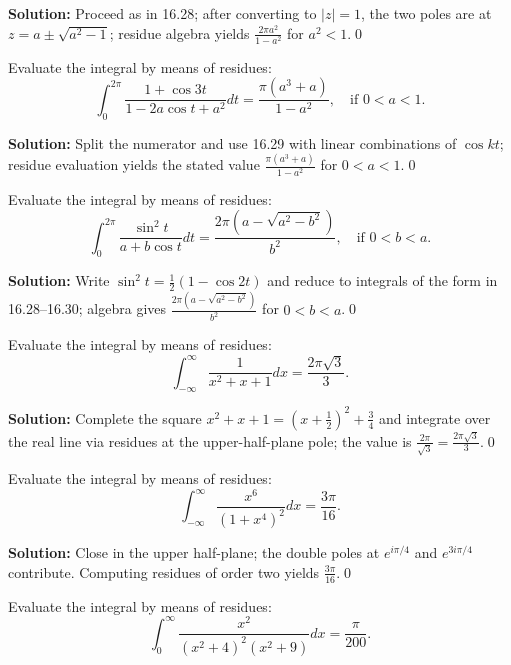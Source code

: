 \noindent\textbf{Solution:}
Proceed as in 16.28; after converting to $|z|=1$, the two poles are at $z=a\pm\sqrt{a^2-1}$; residue algebra yields $\frac{2\pi a^2}{1-a^2}$ for $a^2<1$.\qed


\begin{problembox}
Evaluate the integral by means of residues:
\[ \int_0^{2\pi} \frac{1 + \cos 3t}{1 - 2a \cos t + a^2} dt = \frac{\pi (a^3 + a)}{1 - a^2}, \quad \text{if } 0 < a < 1. \]
\end{problembox}

\noindent\textbf{Solution:}
Split the numerator and use 16.29 with linear combinations of $\cos kt$; residue evaluation yields the stated value $\frac{\pi(a^3+a)}{1-a^2}$ for $0<a<1$.\qed


\begin{problembox}
Evaluate the integral by means of residues:
\[ \int_0^{2\pi} \frac{\sin^2 t}{a + b \cos t} dt = \frac{2\pi (a - \sqrt{a^2 - b^2})}{b^2}, \quad \text{if } 0 < b < a. \]
\end{problembox}

\noindent\textbf{Solution:}
Write $\sin^2 t=\tfrac{1}{2}(1-\cos 2t)$ and reduce to integrals of the form in 16.28–16.30; algebra gives $\frac{2\pi(a-\sqrt{a^2-b^2})}{b^2}$ for $0<b<a$.\qed


\begin{problembox}
Evaluate the integral by means of residues:
\[ \int_{-\infty}^{\infty} \frac{1}{x^2 + x + 1} dx = \frac{2\pi \sqrt{3}}{3}. \]
\end{problembox}

\noindent\textbf{Solution:}
Complete the square $x^2+x+1=(x+\tfrac12)^2+\tfrac34$ and integrate over the real line via residues at the upper-half-plane pole; the value is $\frac{2\pi}{\sqrt{3}}=\frac{2\pi\sqrt{3}}{3}$.\qed


\begin{problembox}
Evaluate the integral by means of residues:
\[ \int_{-\infty}^{\infty} \frac{x^6}{(1 + x^4)^2} dx = \frac{3\pi}{16}. \]
\end{problembox}

\noindent\textbf{Solution:}
Close in the upper half-plane; the double poles at $e^{i\pi/4}$ and $e^{3i\pi/4}$ contribute. Computing residues of order two yields $\frac{3\pi}{16}$.\qed


\begin{problembox}
Evaluate the integral by means of residues:
\[ \int_0^{\infty} \frac{x^2}{(x^2 + 4)^2 (x^2 + 9)} dx = \frac{\pi}{200}. \]
\end{problembox}

